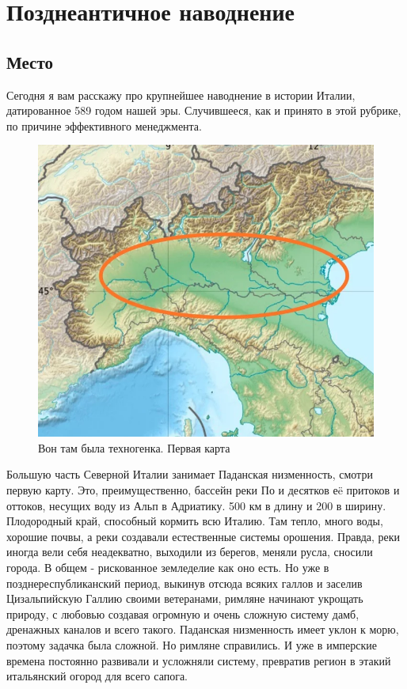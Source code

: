 \chapter{Позднеантичное наводнение}

\section{Место}
Сегодня я вам расскажу про крупнейшее наводнение в истории Италии, датированное 589 годом нашей эры. Случившееся, как и принято в этой рубрике, по причине эффективного менеджмента. 

\begin{figure}[h!tb]
	\centering\includegraphics[scale=0.4]{Data/antic_technocrash/1614663824140324608.png}
	\caption{Вон там была техногенка. Первая карта
	}
	\label{fig:tech1} %
\end{figure}



Большую часть Северной Италии занимает Паданская низменность, смотри первую карту. Это, преимущественно, бассейн реки По и десятков еë притоков и оттоков, несущих воду из Альп в Адриатику. 500 км в длину и 200 в ширину. Плодородный край, способный кормить всю Италию. Там тепло, много воды, хорошие почвы, а реки создавали естественные системы орошения. Правда, реки иногда вели себя неадекватно, выходили из берегов, меняли русла, сносили города. В общем - рискованное земледелие как оно есть. Но уже в позднереспубликанский период, выкинув отсюда всяких галлов и заселив Цизальпийскую Галлию своими ветеранами, римляне начинают укрощать природу, с любовью создавая огромную и очень сложную систему дамб, дренажных каналов и всего такого. Паданская низменность имеет уклон к морю, поэтому задачка была сложной. Но римляне справились. И уже в имперские времена постоянно развивали и усложняли систему, превратив регион в этакий итальянский огород для всего сапога.



